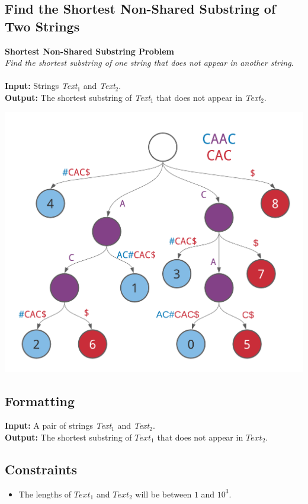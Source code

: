 \documentclass{article}
\begin{document}
\subsection{Find the Shortest Non-Shared Substring of Two Strings}
\hline\vspace{5}
\textbf{Shortest Non-Shared Substring Problem}\\
\emph{Find the shortest substring of one string that does not appear in another string}.\\ \\
\textbf{Input:} Strings \emph{Text}$_1$ and \emph{Text}$_2$.\\
\textbf{Output:} The shortest substring of \emph{Text}$_1$ that does not appear in \emph{Text}$_2$.
\begin{center}
    \includegraphics[scale=0.2]{logos/9F.png}
\end{center}
\hline \vspace{5}

\subsection*{Formatting}
\textbf{Input:} A pair of strings \emph{Text}$_1$ and \emph{Text}$_2$.\\
\noindent\textbf{Output:} The shortest substring of $Text_1$ that does not appear in $Text_2$.

\subsection*{Constraints}
\begin{itemize}
    \item The lengths of $Text_1$ and $Text_2$ will be between $1$ and $10^3$.
\end{itemize}
\pagebreak
\end{document}
